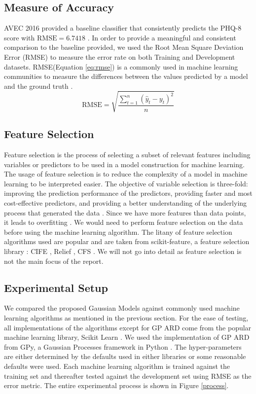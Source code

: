 \documentclass{article}
\begin{document}
 	\subsection{Measure of Accuracy}
	AVEC 2016 provided a baseline classifier that consistently predicts the PHQ-8 score with $\text{RMSE}=6.7418$ \cite{avec2016}. 
	In order to provide a meaningful and consistent comparison to the baseline provided, we used the Root Mean Square Deviation Error (RMSE) to measure the error rate on both Training and Development datasets. 
	RMSE(Equation \ref{eq:rmse}) is a commonly used in machine learning communities to measure the differences between the values predicted by a model 
	and the ground truth \cite{Dhanani:EECS-2014-131}. 
	\begin{equation}\label{eq:rmse}
  	\text{RMSE} = \sqrt{\frac{\sum_{t=1}^n (\hat y_t - y_t)^2}{n}}
 	\end{equation} 

	\subsection{Feature Selection}
	Feature selection is the process of selecting a subset of relevant features including variables or predictors to be used in a model construction for machine learning. 
	The usage of feature selection is to reduce the complexity of a model in machine learning to be interpreted easier. 
	The objective of variable selection is three-fold: improving the prediction performance of the predictors, providing faster and most cost-effective predictors, 
	and providing a better understanding of the underlying process that generated the data \cite{Guyon2003}.
	Since we have more features than data points, it leads to overfitting \cite{Smith2011}. 
	We would need to perform feature selection on the data before using the machine learning algorithm. 
	The litany of feature selection algorithms used are popular and are taken from scikit-feature, a feature selection library \cite{li2016feature}: CIFE \cite{Lin2006}, Relief \cite{Rob2003}, CFS \cite{HALLHALL}. 
	We will not go into detail as feature selection is not the main focus of the report.
	
	\subsection{Experimental Setup}
	We compared the proposed Gaussian Models against commonly used machine learning algorithms as mentioned in the previous section. 
	For the ease of testing, all implementations of the algorithms except for GP ARD come from the popular machine learning library, Scikit Learn \cite{scikit-learn}. 
	We used the implementation of GP ARD from GPy, a Gaussian Processes framework in Python \cite{gpy2014}.
	The hyper-parameters are either determined by the defaults used in either libraries or some reasonable defaults were used.
	Each machine learning algorithm is trained against the training set and thereafter tested against the development set using RMSE as the error metric. 
	The entire experimental process is shown in Figure \ref{process}. \\
 
\end{document}
